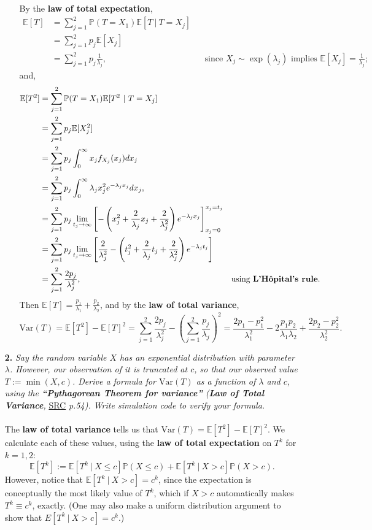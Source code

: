 \documentclass [10pt] {article}
\newcommand{\ds}{\displaystyle}
\newcommand{\Var}{\mathrm{Var}}
\newcommand{\E}{\mathbb{E}}
\renewcommand{\P}{\mathbb{P}}
\begin{document}
\begin{enumerate}
\begin{enumerate}
By the {\bf law of total expectation},
\begin{align*}
    \E[T]&=\sum_{j=1}^2\P(T=X_1)\E[T \ | \ T=X_j]\\
    &=\sum_{j=1}^2p_j\E[X_j]\\
    &=\sum_{j=1}^2p_j\frac{1}{\lambda_j},&&\text{since $X_j\sim\exp(\lambda_j)$ implies $\E[X_j]=\frac{1}{\lambda_j}$;}%
\end{align*}
and,
\begin{align*}
    \E[T^2]&=\sum_{j=1}^2\P(T=X_1)\E[T^2 \ | \ T=X_j]\\
    &=\sum_{j=1}^2p_j\E[X_j^2]\\
    &=\sum_{j=1}^2p_j\int_0^\infty x_jf_{X_j}(x_j)dx_j\\
    &=\sum_{j=1}^2p_j\int_0^\infty\lambda_jx_j^2e^{-\lambda_j x_j}dx_j,\\
    &=\sum_{j=1}^2p_j\lim_{t_j\to\infty}\left[-\left(x_j^2+\frac{2}{\lambda_j}x_j+\frac{2}{\lambda_j^2}\right)e^{-\lambda_j x_j}\right]_{x_j=0}^{x_j=t_j}\\
    &=\sum_{j=1}^2p_j\lim_{t_j\to\infty}\left[\frac{2}{\lambda_j^2}-\left(t_j^2+\frac{2}{\lambda_j}t_j+\frac{2}{\lambda_j^2}\right)e^{-\lambda_jt_j}\right]\\
    &=\sum_{j=1}^2\frac{2p_j}{\lambda_j^2},&&\text{using {\bf L'H\^{o}pital's rule}.}%
\end{align*}
Then $\ds\E[T]=\frac{p_1}{\lambda_1}+\frac{p_2}{\lambda_2}$, and by the {\bf law of total variance},
$$\Var(T)=\E[T^2]-\E[T]^2=\sum_{j=1}^2\frac{2p_j}{\lambda_j^2}-\left(\sum_{j=1}^2\frac{p_j}{\lambda_j}\right)^2=\frac{2p_1-p_1^2}{\lambda_1^2}-2\frac{p_1p_2}{\lambda_1\lambda_2}+\frac{2p_2-p_2^2}{\lambda_2^2}.$$ 
\end{enumerate}
\newpage
\item[{\bf2.}] {\it Say the random variable $X$ has an exponential distribution with parameter $\lambda$. However, our observation of it is truncated at $c$, so that our observed value $T:=\min(X,c)$. Derive a formula for $\Var(T)$ as a function of $\lambda$ and $c$, using the {\bf``Pythagorean Theorem for variance''} ({\bf Law of Total Variance}, }\href{https://heather.cs.ucdavis.edu/~matloff/132/PLN/OldPLN/ProbStatBook256Fall2022.pdf}{SRC} {\it p.54). Write simulation code to verify your formula.}\\\\
The {\bf law of total variance} tells us that $\ds\Var(T)=\E[T^2]-\E[T]^2$. We calculate each of these values, using the {\bf law of total expectation} on $T^k$ for $k=1,2$:
$$\E[T^k]:=\E[T^k \ | \ X\le c]\P(X\le c)+\E[T^k \ | \ X>c]\P(X>c).$$
However, notice that $\E[T^k \ | \ X>c] = c^k$, since the expectation is conceptually the most likely value of $T^k$, which if $X>c$ automatically makes $T^k\equiv c^k$, exactly. (One may also make a uniform distribution argument to show that $\ds E[T^k \ | \ X>c] = c^k$.)


\end{enumerate}
\end{document}
